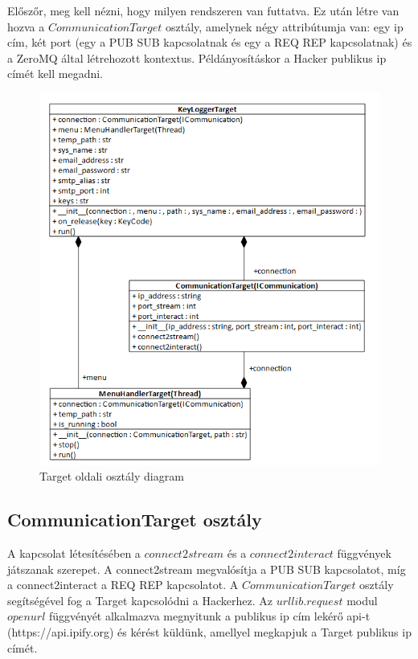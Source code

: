 \documentclass[12pt,a4paper,oneside]{report}
\begin{document}
Előszőr, meg kell nézni, hogy milyen rendszeren van futtatva. Ez után létre van hozva a $CommunicationTarget$ osztály, amelynek négy attribútumja van: egy ip cím, két port (egy a PUB SUB kapcsolatnak és egy a REQ REP kapcsolatnak) és a ZeroMQ által létrehozott kontextus. Példányosításkor a Hacker publikus ip címét kell megadni.
\begin{figure}[H]
\centering
\includegraphics[width=400pt]{../images/targetclassdiagram}
\caption{Target oldali osztály diagram}
\label{fig:clientclassdia}
\end{figure}

\subsection{CommunicationTarget osztály}\label{subsubsec:clinetclass}
A kapcsolat létesítésében a $connect2stream$ és a $connect2interact$ függvények játszanak szerepet. A connect2stream megvalósítja a PUB SUB kapcsolatot, míg a connect2interact a REQ REP kapcsolatot. A $CommunicationTarget$ osztály segítségével fog a Target kapcsolódni a Hackerhez. Az $urllib.request$ modul $openurl$ függvényét alkalmazva megnyitunk a publikus ip cím lekérő api-t (https://api.ipify.org) és kérést küldünk, amellyel megkapjuk a Target publikus ip címét.
\end{document}
